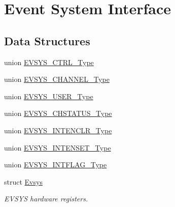 \hypertarget{group___s_a_m_d21___e_v_s_y_s}{}\section{Event System Interface}
\label{group___s_a_m_d21___e_v_s_y_s}
\subsection*{Data Structures}
\begin{DoxyCompactItemize}
\item 
union \mbox{\hyperlink{union_e_v_s_y_s___c_t_r_l___type}{E\+V\+S\+Y\+S\+\_\+\+C\+T\+R\+L\+\_\+\+Type}}
\item 
union \mbox{\hyperlink{union_e_v_s_y_s___c_h_a_n_n_e_l___type}{E\+V\+S\+Y\+S\+\_\+\+C\+H\+A\+N\+N\+E\+L\+\_\+\+Type}}
\item 
union \mbox{\hyperlink{union_e_v_s_y_s___u_s_e_r___type}{E\+V\+S\+Y\+S\+\_\+\+U\+S\+E\+R\+\_\+\+Type}}
\item 
union \mbox{\hyperlink{union_e_v_s_y_s___c_h_s_t_a_t_u_s___type}{E\+V\+S\+Y\+S\+\_\+\+C\+H\+S\+T\+A\+T\+U\+S\+\_\+\+Type}}
\item 
union \mbox{\hyperlink{union_e_v_s_y_s___i_n_t_e_n_c_l_r___type}{E\+V\+S\+Y\+S\+\_\+\+I\+N\+T\+E\+N\+C\+L\+R\+\_\+\+Type}}
\item 
union \mbox{\hyperlink{union_e_v_s_y_s___i_n_t_e_n_s_e_t___type}{E\+V\+S\+Y\+S\+\_\+\+I\+N\+T\+E\+N\+S\+E\+T\+\_\+\+Type}}
\item 
union \mbox{\hyperlink{union_e_v_s_y_s___i_n_t_f_l_a_g___type}{E\+V\+S\+Y\+S\+\_\+\+I\+N\+T\+F\+L\+A\+G\+\_\+\+Type}}
\item 
struct \mbox{\hyperlink{struct_evsys}{Evsys}}
\begin{DoxyCompactList}\small\item\em E\+V\+S\+YS hardware registers. \end{DoxyCompactList}\end{DoxyCompactItemize}
